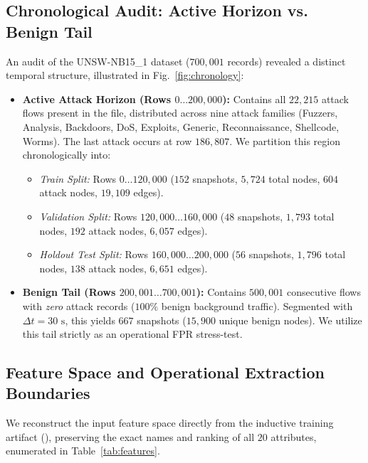 \documentclass[conference]{IEEEtran}
\begin{document}
\subsection{Chronological Audit: Active Horizon vs. Benign Tail}
An audit of the UNSW-NB15\_1 dataset ($700{,}001$ records) revealed a distinct temporal structure, illustrated in Fig.~\ref{fig:chronology}:
\begin{itemize}
    \item \textbf{Active Attack Horizon (Rows $0 \dots 200{,}000$):} Contains all $22{,}215$ attack flows present in the file, distributed across nine attack families (Fuzzers, Analysis, Backdoors, DoS, Exploits, Generic, Reconnaissance, Shellcode, Worms). The last attack occurs at row $186{,}807$. We partition this region chronologically into:
    \begin{itemize}
        \item \textit{Train Split:} Rows $0 \dots 120{,}000$ ($152$ snapshots, $5{,}724$ total nodes, $604$ attack nodes, $19{,}109$ edges).
        \item \textit{Validation Split:} Rows $120{,}000 \dots 160{,}000$ ($48$ snapshots, $1{,}793$ total nodes, $192$ attack nodes, $6{,}057$ edges).
        \item \textit{Holdout Test Split:} Rows $160{,}000 \dots 200{,}000$ ($56$ snapshots, $1{,}796$ total nodes, $138$ attack nodes, $6{,}651$ edges).
    \end{itemize}
    \item \textbf{Benign Tail (Rows $200{,}001 \dots 700{,}001$):} Contains $500{,}001$ consecutive flows with \textit{zero} attack records ($100\%$ benign background traffic). Segmented with $\Delta t = 30\text{ s}$, this yields $667$ snapshots ($15{,}900$ unique benign nodes). We utilize this tail strictly as an operational FPR stress-test.
\end{itemize}

\subsection{Feature Space and Operational Extraction Boundaries}
We reconstruct the input feature space directly from the inductive training artifact (), preserving the exact names and ranking of all $20$ attributes, enumerated in Table~\ref{tab:features}.
\end{document}
